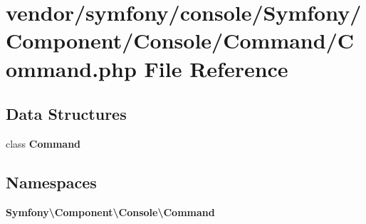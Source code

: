 \section{vendor/symfony/console/\+Symfony/\+Component/\+Console/\+Command/\+Command.php File Reference}
\label{vendor_2symfony_2console_2_symfony_2_component_2_console_2_command_2_command_8php}
\subsection*{Data Structures}
\begin{DoxyCompactItemize}
\item 
class {\bf Command}
\end{DoxyCompactItemize}
\subsection*{Namespaces}
\begin{DoxyCompactItemize}
\item 
 {\bf Symfony\textbackslash{}\+Component\textbackslash{}\+Console\textbackslash{}\+Command}
\end{DoxyCompactItemize}
